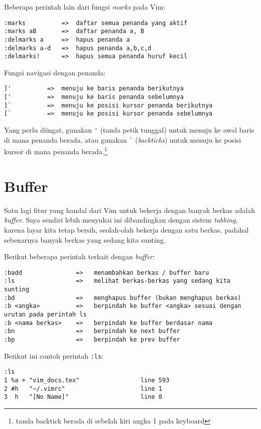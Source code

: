 \documentclass{article}
\begin{document}
Beberapa perintah lain dari fungsi \emph{marks} pada Vim:

\begin{verbatim}
:marks          =>  daftar semua penanda yang aktif
:marks aB       =>  daftar penanda a, B
:delmarks a     =>  hapus penanda a
:delmarks a-d   =>  hapus penanda a,b,c,d
:delmarks!      =>  hapus semua penanda huruf kecil
\end{verbatim}

Fungsi navigasi dengan penanda:

\begin{verbatim}
]'          =>  menuju ke baris penanda berikutnya
['          =>  menuju ke baris penanda sebelumnya
]`          =>  menuju ke posisi kursor penanda berikutnya
[`          =>  menuju ke posisi kursor penanda sebelumnya 
\end{verbatim}

Yang perlu diingat, gunakan \verb='= (tanda petik tunggal)
untuk menuju ke awal baris di mana penanda berada, atau
gunakan \verb=`= (\emph{backticks}) untuk menuju ke posisi
kursor di mana penanda berada.\footnote{tanda backtick
berada di sebelah kiri angka 1 pada keyboard}

\section{Buffer}
Satu lagi fitur yang handal dari Vim untuk bekerja dengan
banyak berkas adalah \emph{buffer}. Saya sendiri lebih
menyukai ini dibandingkan dengan sistem \emph{tabbing},
karena layar kita tetap bersih, seolah-olah bekerja dengan
satu berkas, padahal sebenarnya banyak berkas yang sedang
kita sunting.

Berikut beberapa perintah terkait dengan \emph{buffer}:

\begin{verbatim}
:badd               =>   menambahkan berkas / buffer baru
:ls                 =>   melihat berkas-berkas yang sedang kita sunting
:bd                 =>   menghapus buffer (bukan menghapus berkas)
:b <angka>          =>   berpindah ke buffer <angka> sesuai dengan urutan pada perintah ls
:b <nama berkas>    =>   berpindah ke buffer berdasar nama
:bn                 =>   berpindah ke next buffer
:bp                 =>   berpindah ke prev buffer
\end{verbatim}

Berikut ini contoh perintah \verb=:ls=:

\begin{verbatim}
:ls
1 %a + "vim_docs.tex"                 line 593
2 #h   "~/.vimrc"                     line 1
3  h   "[No Name]"                    line 0
\end{verbatim}
\end{document}
